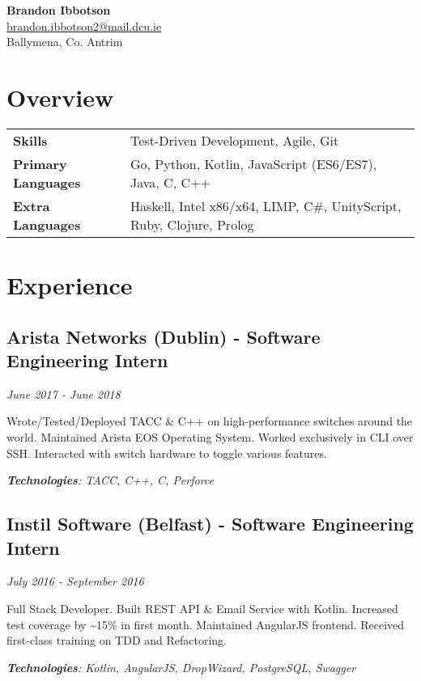 \documentclass{article}
\newcommand{\youremail}[1]{\href{mailto:#1}{#1}}
\newcommand{\yourtitle}[4]{
  \begin{center}
    {\huge\bfseries #1}\\
    \vspace{0.5em}
    \youremail{#3}\\
    {#2}\\
  \end{center}
}
\begin{document}
\yourtitle{Brandon Ibbotson}{Ballymena, Co. Antrim}{brandon.ibbotson2@mail.dcu.ie}{byxor.xyz}
\section{Overview}
\begin{tabularx}{\textwidth}{ll}
\vspace{0.75em}
\textbf{Skills} & Test-Driven Development, {} Agile, {} Git\\
\vspace{0.75em}
\textbf{Primary Languages} & Go, {} Python, {} Kotlin, {} JavaScript (ES6/ES7), {} Java, {} C, {} C++\\
\textbf{Extra Languages} & Haskell, {} Intel x86/x64, {} LIMP, {} C\#, {} UnityScript, {} Ruby, {} Clojure, {} Prolog\\
\end{tabularx}
\section{Experience}
\subsection{Arista Networks (Dublin) - Software Engineering Intern}
\textit{June 2017 - June 2018}

Wrote/Tested/Deployed TACC \& C++ on high-performance switches around the world. Maintained Arista EOS Operating System. Worked exclusively in CLI over SSH. Interacted with switch hardware to toggle various features.

\textit{\textbf{Technologies}: TACC, C++, C, Perforce}
\vspace{0.5em}
\subsection{Instil Software (Belfast) - Software Engineering Intern}
\textit{July 2016 - September 2016}

Full Stack Developer. Built REST API \& Email Service with Kotlin. Increased test coverage by \textasciitilde{}15\% in first month. Maintained AngularJS frontend. Received first-class training on TDD and Refactoring.

\textit{\textbf{Technologies}: Kotlin, AngularJS, DropWizard, PostgreSQL, Swagger}
\vspace{0.5em}
\end{document}
